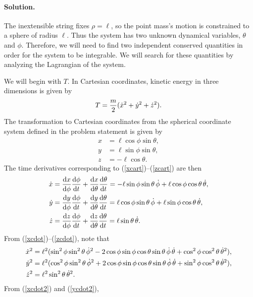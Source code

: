 \documentclass[11pt]{article}
\newcommand{\refeq}[1]{(\ref{#1})}
\newenvironment{solution}
{
    \paragraph{Solution.}
    \ignorespaces
}
{
    \bigskip
}
\begin{document}
\begin{solution}
	The inextensible string fixes $\rho = \ell$, so the point mass's motion is constrained to a sphere of radius $\ell$.  Thus the system has two unknown dynamical variables, $\theta$ and $\phi$.  Therefore, we will need to find two independent conserved quantities in order for the system to be integrable.  We will search for these quantities by analyzing the Lagrangian of the system.
	
	We will begin with $T$.  In Cartesian coordinates, kinetic energy in three dimensions is given by
	\begin{equation} \label{Tcart}
		T = \frac{m}{2} (\dot{x}^2 + \dot{y}^2 + \dot{z}^2).
	\end{equation}
	The transformation to Cartesian coordinates from the spherical coordinate system defined in the problem statement is given by
	\begin{align}
		x &= \ell \cos{\phi} \sin{\theta}, \label{xcart} \\
		y &= \ell \sin{\phi} \sin{\theta}, \label{ycart} \\
		z &= -\ell \cos{\theta}. \label{zcart}
	\end{align}
	The time derivatives corresponding to \refeq{xcart}--\refeq{zcart} are then
	\begin{align}
		\dot{x} &= \dv{x}{\phi} \dv{\phi}{t} + \dv{x}{\theta} \dv{\theta}{t} = -\ell \sin{\phi} \sin{\theta} \,\dot{\phi} + \ell \cos{\phi} \cos{\theta} \,\dot{\theta}, \label{xcdot} \\
		\dot{y} &= \dv{y}{\phi} \dv{\phi}{t} + \dv{y}{\theta} \dv{\theta}{t} = \ell \cos{\phi} \sin{\theta} \,\dot{\phi} + \ell \sin{\phi} \cos{\theta} \,\dot{\theta}, \label{ycdot} \\
		\dot{z} &= \dv{z}{\phi} \dv{\phi}{t} + \dv{z}{\theta} \dv{\theta}{t} = \ell \sin{\theta} \,\dot{\theta}. \label{zcdot}
	\end{align}
	From \refeq{xcdot}--\refeq{zcdot}, note that
	\begin{align}
	\dot{x}^2 &= \ell^2 (\sin^2{\phi} \sin^2{\theta} \,\dot{\phi}^2 - 2 \cos{\phi} \sin{\phi} \cos{\theta} \sin{\theta} \,\dot{\phi} \,\dot{\theta} + \cos^2{\phi} \cos^2{\theta} \,\dot{\theta}^2), \label{xcdot2} \\
	\dot{y}^2 &= \ell^2 (\cos^2{\phi} \sin^2{\theta} \,\dot{\phi}^2 + 2 \cos{\phi} \sin{\phi} \cos{\theta} \sin{\theta} \,\dot{\phi} \,\dot{\theta} + \sin^2{\phi} \cos^2{\theta} \,\dot{\theta}^2), \label{ycdot2} \\
	\dot{z}^2 &= \ell^2 \sin^2{\theta} \,\dot{\theta}^2. \label{zcdot2}
	\end{align}
	From \refeq{xcdot2} and \refeq{ycdot2},

\end{solution}
\end{document}
